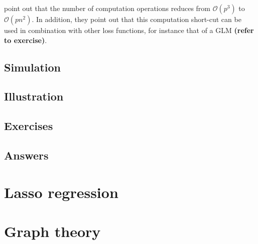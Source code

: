 \documentclass[a4paper]{article}
\theoremstyle{myexamplestyle}
\def\reminder#1{\marginpar{\rule[0pt]{1mm}{11pt}}\textbf{#1}}
\begin{document}
\cite{Hast2004} point out that the number of computation operations reduces from $\mathcal{O}(p^3)$ to $\mathcal{O}(p n^2)$. In addition, they point out that this computation short-cut can be used in combination with other loss functions, for instance that of a GLM \reminder{(refer to exercise)}.





\subsection{Simulation}

\subsection{Illustration}

\subsection{Exercises}

\subsection{Answers}



\newpage
\section{Lasso regression}


\newpage
\section{Graph theory}


\newpage
\end{document}

